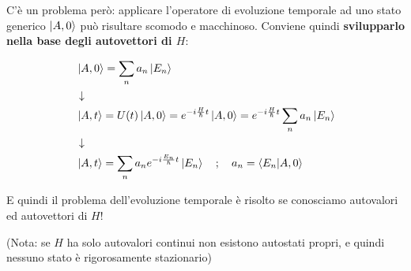 \bigskip


C'è un problema però: applicare l'operatore di evoluzione temporale ad uno stato generico $\ket{A,0}$ può risultare scomodo e macchinoso. Conviene quindi \textbf{svilupparlo nella base degli autovettori di $H$}:
	
\begin{align}
{}&\ket{A,0}= \sum_{n}a_n \ket{E_n} \\
&\downarrow \nonumber \\
&\ket{A,t}=U(t)\ket{A,0}=e^{-i\frac{H}{\hbar}t}\ket{A,0}= e^{-i\frac{H}{\hbar}t}\sum_{n}a_n \ket{E_n}\\
&\downarrow \nonumber \\
&\ket{A,t}= \sum_{n}a_n e^{-i\frac{E_n}{\hbar}t} \ket{E_n} \quad ; \quad a_n =\braket{E_n|A,0}
\end{align}

E quindi il problema dell'evoluzione temporale è risolto se conosciamo autovalori ed autovettori di $H$! 

(Nota: se $H$ ha solo autovalori continui non esistono autostati propri, e quindi nessuno stato è rigorosamente stazionario)
